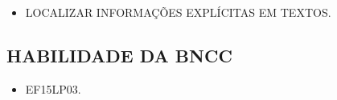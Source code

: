 \begin{itemize}
\item \uppercase{Localizar informações explícitas em textos.}
\end{itemize}

\subsection{HABILIDADE DA BNCC}

\begin{itemize}
\item EF15LP03.
\end{itemize}

